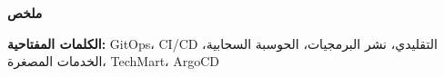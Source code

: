 \thispagestyle{empty}

\begin{center}
{\Large \textbf{\textarabic{ملخص}}}
\end{center}

\vspace{1cm}

\begin{otherlanguage}{arabic}
\begin{RTL}



\textbf{الكلمات المفتاحية:} GitOps، CI/CD التقليدي، نشر البرمجيات، الحوسبة السحابية، الخدمات المصغرة، TechMart، ArgoCD

\end{RTL}
\end{otherlanguage}

\newpage